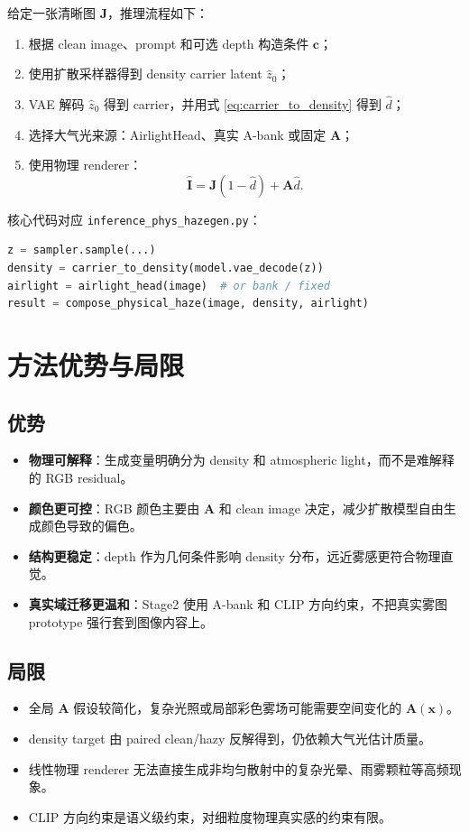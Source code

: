 \documentclass[11pt,a4paper]{ctexart}
\begin{document}
给定一张清晰图 $\bm{J}$，推理流程如下：
\begin{enumerate}[leftmargin=2em]
  \item 根据 clean image、prompt 和可选 depth 构造条件 $\mathbf{c}$；
  \item 使用扩散采样器得到 density carrier latent $\hat{z}_0$；
  \item VAE 解码 $\hat{z}_0$ 得到 carrier，并用式 \eqref{eq:carrier_to_density} 得到 $\hat{d}$；
  \item 选择大气光来源：AirlightHead、真实 A-bank 或固定 $\bm{A}$；
  \item 使用物理 renderer：
  \[
    \hat{\bm{I}} = \bm{J}(1-\hat{d})+\bm{A}\hat{d}.
  \]
\end{enumerate}
核心代码对应 \texttt{inference\_phys\_hazegen.py}：
\begin{lstlisting}[language=Python]
z = sampler.sample(...)
density = carrier_to_density(model.vae_decode(z))
airlight = airlight_head(image)  # or bank / fixed
result = compose_physical_haze(image, density, airlight)
\end{lstlisting}

\section{方法优势与局限}

\subsection{优势}

\begin{itemize}[leftmargin=2em]
  \item \textbf{物理可解释}：生成变量明确分为 density 和 atmospheric light，而不是难解释的 RGB residual。
  \item \textbf{颜色更可控}：RGB 颜色主要由 $\bm{A}$ 和 clean image 决定，减少扩散模型自由生成颜色导致的偏色。
  \item \textbf{结构更稳定}：depth 作为几何条件影响 density 分布，远近雾感更符合物理直觉。
  \item \textbf{真实域迁移更温和}：Stage2 使用 A-bank 和 CLIP 方向约束，不把真实雾图 prototype 强行套到图像内容上。
\end{itemize}

\subsection{局限}

\begin{itemize}[leftmargin=2em]
  \item 全局 $\bm{A}$ 假设较简化，复杂光照或局部彩色雾场可能需要空间变化的 $\bm{A}(\bm{x})$。
  \item density target 由 paired clean/hazy 反解得到，仍依赖大气光估计质量。
  \item 线性物理 renderer 无法直接生成非均匀散射中的复杂光晕、雨雾颗粒等高频现象。
  \item CLIP 方向约束是语义级约束，对细粒度物理真实感的约束有限。
\end{itemize}
\end{document}
